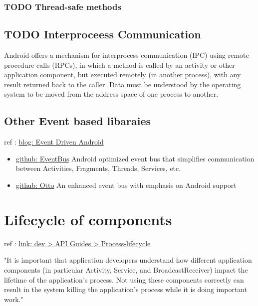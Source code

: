 \documentclass[11pt]{article}
\begin{document}
\subsubsection{{\bfseries\sffamily TODO} Thread-safe methods}
\label{sec:orgheadline3}

\subsection{{\bfseries\sffamily TODO} Interproceess Communication}
\label{sec:orgheadline5}
Android offers a mechanism for interprocess communication (IPC) using remote
procedure calls (RPCs), in which a method is called by an activity or other
application component, but executed remotely (in another process), with any
result returned back to the caller. Data must be understood by the operating
system to be moved from the address space of one process to another.


\subsection{Other Event based libaraies}
\label{sec:orgheadline6}
ref : \href{http://wale.oyediran.me/2015/07/16/event-driven-android/}{blog: Event Driven Android}

\begin{itemize}
\item \href{http://greenrobot.github.io/EventBus/}{github: EventBus} Android optimized event bus that simplifies communication
between Activities, Fragments, Threads, Services, etc.
\item \href{http://square.github.io/otto/}{github: Otto} An enhanced event bus with emphasis on Android support
\end{itemize}


\section{Lifecycle of components}
\label{sec:orgheadline9}

ref : \href{https://developer.android.com/guide/topics/processes/process-lifecycle.html}{link: dev > API Guides > Process-lifecycle}

"It is important that application developers understand how different
application components (in particular Activity, Service, and
BroadcastReceiver) impact the lifetime of the application's process. Not using
these components correctly can result in the system killing the application's
process while it is doing important work."
\end{document}
